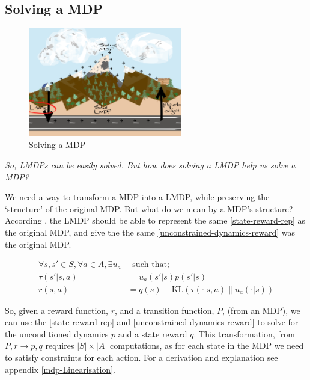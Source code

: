 \subsection{Solving a MDP}\label{construct-lmdp-from-mdp}

\begin{figure}[h!]
\centering
\includegraphics[width=0.6\textwidth,height=0.3\textheight]{../../pictures/drawings/abstract-representations-linear.png}
\caption{Solving a MDP}
\end{figure}

\begin{displayquote}
\textsl{So, LMDPs can be easily solved. But how does solving a LMDP help us solve a MDP?}
\end{displayquote}

We need a way to transform a MDP into a LMDP, while preserving the
`structure' of the original MDP. But what do we mean by a MDP's structure?
According \cite{Todorov2009}, the LMDP should be able to represent the same \ref{state-reward-rep} as the original MDP,
and give the the same \ref{unconstrained-dynamics-reward} was the original MDP.

\begin{align*}
\forall s, s' \in S, \forall a \in A, \exists u_a& \;\;\text{such that;} \\
\tau(s' | s, a) &= u_a(s'|s)p(s'|s) \tag{transition dynamics} \label{state-reward-rep} \\
r(s, a) &= q(s) - \text{KL}(\tau(\cdot | s, a) \parallel u_a(\cdot| s) ) \label{unconstrained-dynamics-reward} \tag{rewards}
\end{align*}


So, given a reward function, $r$, and a transition function, $P$,
(from an MDP), we can use the \ref{state-reward-rep} and \ref{unconstrained-dynamics-reward}
to solve for the unconditioned dynamics $p$ and a state reward $q$.
This transformation, from $P, r \to p, q$ requires $|S| \times |A|$ computations, as for each state in the
MDP we need to satisfy constraints for each action. For a derivation and explanation see appendix \ref{mdp-Linearisation}.

